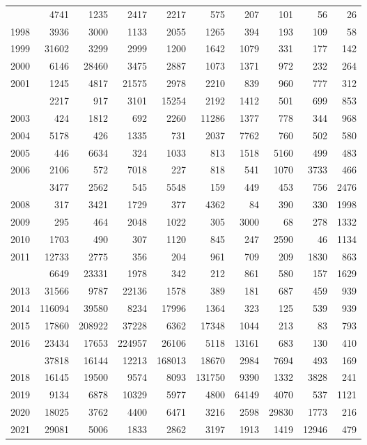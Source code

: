 \documentclass[
]{article}
\begin{document}
\begin{longtable}[t]{lrrrrrrrrr}
\addlinespace
1997 & 4741 & 1235 & 2417 & 2217 & 575 & 207 & 101 & 56 & 26\\
1998 & 3936 & 3000 & 1133 & 2055 & 1265 & 394 & 193 & 109 & 58\\
1999 & 31602 & 3299 & 2999 & 1200 & 1642 & 1079 & 331 & 177 & 142\\
2000 & 6146 & 28460 & 3475 & 2887 & 1073 & 1371 & 972 & 232 & 264\\
2001 & 1245 & 4817 & 21575 & 2978 & 2210 & 839 & 960 & 777 & 312\\
\addlinespace
2002 & 2217 & 917 & 3101 & 15254 & 2192 & 1412 & 501 & 699 & 853\\
2003 & 424 & 1812 & 692 & 2260 & 11286 & 1377 & 778 & 344 & 968\\
2004 & 5178 & 426 & 1335 & 731 & 2037 & 7762 & 760 & 502 & 580\\
2005 & 446 & 6634 & 324 & 1033 & 813 & 1518 & 5160 & 499 & 483\\
2006 & 2106 & 572 & 7018 & 227 & 818 & 541 & 1070 & 3733 & 466\\
\addlinespace
2007 & 3477 & 2562 & 545 & 5548 & 159 & 449 & 453 & 756 & 2476\\
2008 & 317 & 3421 & 1729 & 377 & 4362 & 84 & 390 & 330 & 1998\\
2009 & 295 & 464 & 2048 & 1022 & 305 & 3000 & 68 & 278 & 1332\\
2010 & 1703 & 490 & 307 & 1120 & 845 & 247 & 2590 & 46 & 1134\\
2011 & 12733 & 2775 & 356 & 204 & 961 & 709 & 209 & 1830 & 863\\
\addlinespace
2012 & 6649 & 23331 & 1978 & 342 & 212 & 861 & 580 & 157 & 1629\\
2013 & 31566 & 9787 & 22136 & 1578 & 389 & 181 & 687 & 459 & 939\\
2014 & 116094 & 39580 & 8234 & 17996 & 1364 & 323 & 125 & 539 & 939\\
2015 & 17860 & 208922 & 37228 & 6362 & 17348 & 1044 & 213 & 83 & 793\\
2016 & 23434 & 17653 & 224957 & 26106 & 5118 & 13161 & 683 & 130 & 410\\
\addlinespace
2017 & 37818 & 16144 & 12213 & 168013 & 18670 & 2984 & 7694 & 493 & 169\\
2018 & 16145 & 19500 & 9574 & 8093 & 131750 & 9390 & 1332 & 3828 & 241\\
2019 & 9134 & 6878 & 10329 & 5977 & 4800 & 64149 & 4070 & 537 & 1121\\
2020 & 18025 & 3762 & 4400 & 6471 & 3216 & 2598 & 29830 & 1773 & 216\\
2021 & 29081 & 5006 & 1833 & 2862 & 3197 & 1913 & 1419 & 12946 & 479\\*
\end{longtable}
\end{document}
